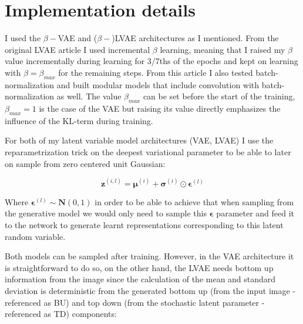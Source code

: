 \documentclass[11pt, english]{article}
\begin{document}
\vspace{7mm}

\section{Implementation details}

\vspace{7mm}

\par I used the $\beta-$VAE and ($\beta-$)LVAE architectures as I mentioned. From the original LVAE article \cite{sonderby2016ladder} I used incremental $\beta$ learning, meaning that I raised my $\beta$ value incrementally during learning for 3/7ths of the epochs and kept on learning with $\beta = \beta_{max}$ for the remaining steps. From this article I also tested batch-normalization and built modular models that include convolution with batch-normalization as well. The value $\beta_{max}$ can be set before the start of the training, $\beta_{max} = 1$ is the case of the VAE but raising its value directly emphasizes the influence of the KL-term during training.

\vspace{3mm}

\par For both of my latent variable model architectures (VAE, LVAE) I use the reparametrization trick on the deepest variational parameter to be able to later on sample from zero centered unit Gaussian:

\vspace{3mm}

\begin{equation}
    \boldsymbol{\bm{z}}^{(i, l)} = \boldsymbol{\mu}^{(i)} + \boldsymbol{\sigma}^{(i)} \odot \boldsymbol{\bm{\epsilon}}^{(l)}
\end{equation}

\vspace{3mm}

\par Where $\boldsymbol{\bm{\epsilon}}^{(l)} \sim \boldsymbol{N}(0, 1)$ in order to be able to achieve that when sampling from the generative model we would only need to sample this $\bm{\epsilon}$ parameter and feed it to the network to generate learnt representations corresponding to this latent random variable.

\vspace{3mm}

\par Both models can be sampled after training. However, in the VAE architecture it is straightforward to do so, on the other hand, the LVAE needs bottom up information from the image since the calculation of the mean and standard deviation is deterministic from the generated bottom up (from the input image - referenced as BU) and top down (from the stochastic latent parameter - referenced as TD) components:
\end{document}
